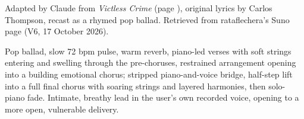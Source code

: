 
\label{sec:thoughts-are-not-crimes}
\begin{notes}
Adapted by Claude from \emph{Victless Crime} (page \pageref{sec:victless-crime}), original lyrics by Carlos Thompson, recast as a rhymed pop ballad. Retrieved from rataflechera's Suno page (V6, 17 October 2026).
\end{notes}
\begin{style}
Pop ballad, slow 72 bpm pulse, warm reverb, piano-led verses with soft strings entering and swelling through the pre-choruses, restrained arrangement opening into a building emotional chorus; stripped piano-and-voice bridge, half-step lift into a full final chorus with soaring strings and layered harmonies, then solo-piano fade. Intimate, breathy lead in the user's own recorded voice, opening to a more open, vulnerable delivery.
\end{style}
